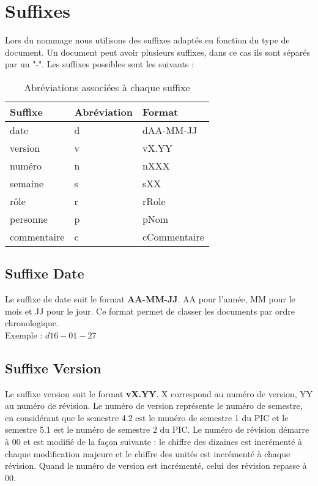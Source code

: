 \section{Suffixes}

Lors du nommage nous utilisons des suffixes adaptés en fonction du type de document. Un document peut avoir plusieurs suffixes, dans ce cas ils sont séparés par un "-". Les suffixes possibles sont les suivants : 

	\begin{table}[H]
		\centering
		\begin{tabularx}{12cm}{|p{4cm}|p{4cm}|p{4cm}|}
		\hline
		\rowcolor[gray]{0.85} Suffixe & Abréviation & Format\\
		\hline
		date & d & dAA-MM-JJ\\
		\hline
		version & v & vX.YY\\
		\hline
		numéro & n & nXXX\\
		\hline
		semaine & s & sXX\\
		\hline
		rôle & r & rRole\\
		\hline
		personne & p & pNom\\
		\hline
		commentaire & c & cCommentaire\\
		\hline
		\end{tabularx}
	\caption{Abréviations associées à chaque suffixe}
	\label{Suffixes}
	\end{table}
	


\subsection{Suffixe Date}
\label{suffixe_date}

Le suffixe de date suit le format \textbf{AA-MM-JJ}. AA pour l'année, MM pour le mois et JJ pour le jour. Ce format permet de classer les documents par ordre chronologique.\\

Exemple : $d16-01-27$ 

\subsection{Suffixe Version}
\label{suffixe_version}

Le suffixe version suit le format \textbf{vX.YY}. X correspond au numéro de version, YY au numéro de révision. Le numéro de version représente le numéro de semestre, en considérant que le semestre 4.2 est le numéro de semestre 1 du PIC et le semestre 5.1 est le numéro de semestre 2 du PIC. Le numéro de révision démarre à 00 et est modifié de la façon suivante : le chiffre des dizaines est incrémenté à chaque modification majeure et le chiffre des unités est incrémenté à chaque révision. Quand le numéro de version est incrémenté, celui des révision repasse à 00.\\

